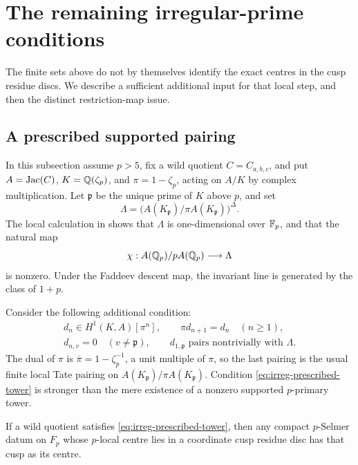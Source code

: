 \section{The remaining irregular-prime conditions}
\label{sec:irreg-gates}

The finite sets above do not by themselves identify the exact
centres in the cusp residue discs. We describe a sufficient
additional input for that local step, and then the distinct
restriction-map issue.

\subsection{A prescribed supported pairing}

In this subsection assume \(p>5\), fix a wild quotient \(C=C_{a,b,c}\),
and put \(A=\operatorname{Jac}(C)\), \(K=\mathbb Q(\zeta_p)\), and
\(\pi=1-\zeta_p\), acting on \(A/K\) by complex multiplication.
Let \(\mathfrak p\) be the unique prime of \(K\) above \(p\), and set
\begin{equation}
 \Lambda=
 \bigl(A(K_{\mathfrak p})/\pi A(K_{\mathfrak p})\bigr)^\Delta.
 \label{eq:irreg-Lambda}
\end{equation}
The local calculation in
\cite[Corollary 2 and Proposition 5, pp.~574--575]{McCallum1994}
shows that \(\Lambda\) is one-dimensional over \(\mathbb F_p\), and that
the natural map
\begin{equation}
 \chi:A(\mathbb Q_p)/pA(\mathbb Q_p)\longrightarrow\Lambda
 \label{eq:irreg-chi}
\end{equation}
is nonzero. Under the Faddeev descent map, the invariant line is
generated by the class of \(1+p\).

Consider the following additional condition:
\begin{equation}
 \begin{gathered}
 d_n\in H^1(K,A)[\pi^n],\qquad
 \pi d_{n+1}=d_n \quad(n\geq1),\\
 d_{n,v}=0\quad(v\neq\mathfrak p),\qquad
 d_{1,\mathfrak p}\text{ pairs nontrivially with }\Lambda.
 \end{gathered}
 \label{eq:irreg-prescribed-tower}
\end{equation}
The dual of \(\pi\) is \(\overline\pi=1-\zeta_p^{-1}\), a unit
multiple of \(\pi\), so the last pairing is the usual finite local
Tate pairing on \(A(K_{\mathfrak p})/\pi A(K_{\mathfrak p})\).
Condition \eqref{eq:irreg-prescribed-tower} is stronger than the
mere existence of a nonzero supported \(p\)-primary tower.

\begin{proposition}\label{prop:irreg-prescribed-isolation}
If a wild quotient satisfies
\eqref{eq:irreg-prescribed-tower}, then any compact \(p\)-Selmer
datum on \(F_p\) whose \(p\)-local centre lies in a coordinate cusp
residue disc has that cusp as its centre.
\end{proposition}

